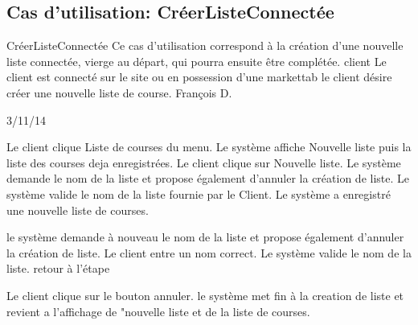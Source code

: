 \subsection{Cas d'utilisation: CréerListeConnectée}

\startCU
\nom CréerListeConnectée
\but Ce cas d’utilisation correspond à la création d’une nouvelle liste connectée, vierge au départ, qui pourra ensuite être complétée.
\acteur client
\precondition Le client est connecté sur le site ou en possession d'une markettab
\declenchement le client désire créer une nouvelle liste de course.
\auteur François D.
\date 03/11/14

\nominal %
\startnominal
\etape Le client clique Liste de courses du menu.
\etape Le système affiche Nouvelle liste puis la liste des courses deja enregistrées.
\etape Le client clique sur Nouvelle liste.
\etape[SA1] Le système demande le nom de la liste et propose également d'annuler la création de liste.
\etape[SA2] Le système valide le nom de la liste fournie par le Client.
\stopnominal
\postcondition Le système a enregistré une nouvelle liste de courses.

\alternatifs %
\startalternatif[SA2] %
  \etape le système demande à nouveau le nom de la liste et propose également d'annuler la création de liste.
  \etape Le client entre un nom correct.
  \etape Le système valide le nom de la liste.
  \etape retour à l'étape \in[RETOUR]
\stopcondition
\postcondition 
\stopalternatif


\exception %
\startalternatif[SA1]
  \etape Le client clique sur le bouton annuler.
  \etape le système met fin à la creation de liste et revient a l'affichage de "nouvelle liste et de la liste de courses.
\stopcondition
\stopalternatif
\stopCU

